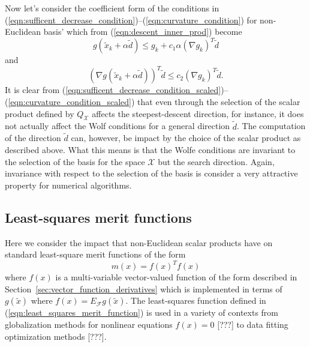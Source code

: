 \documentclass[pdf,ps2pdf,11pt]{SANDreport}
\begin{document}
Now let's consider the coefficient form of the conditions in
(\ref{eqn:sufficent_decrease_condition})--(\ref{eqn:curvature_condition}) for
non-Euclidean basis' which from (\ref{eqn:descent_inner_prod}) become
%
\begin{equation}
g(\tilde{x}_k + \alpha \tilde{d}) \le g_k + c_1 \alpha (\nabla g_k)^T \tilde{d}
\label{eqn:sufficent_decrease_condition_scaled}
\end{equation}
%
and
%
\begin{equation}
(\nabla g(\tilde{x}_k + \alpha \tilde{d}))^T \tilde{d} \le c_2 (\nabla g_k)^T \tilde{d}.
\label{eqn:curvature_condition_scaled}
\end{equation}
%
It is clear from
(\ref{eqn:sufficent_decrease_condition_scaled})--(\ref{eqn:curvature_condition_scaled})
that even through the selection of the scalar product defined by
$Q_{\mathcal{X}}$ affects the steepest-descent direction, for instance, it
does not actually affect the Wolf conditions for a general direction
$\tilde{d}$.  The computation of the direction $\tilde{d}$ can, however, be
impact by the choice of the scalar product as described above.  What this
means is that the Wolfe conditions are invariant to the selection of the basis
for the space $\mathcal{X}$ but the search direction.  Again, invariance with
respect to the selection of the basis is consider a very attractive property
for numerical algorithms.

\subsection{Least-squares merit functions}

Here we consider the impact that non-Euclidean scalar products have on
standard least-square merit functions of the form
%
\begin{equation}
m(x) = f(x)^T f(x)
\label{eqn:least_squares_merit_function}
\end{equation}
%
where $f(x)$ is a multi-variable vector-valued function of the form described
in Section~\ref{sec:vector_function_derivatives} which is implemented in terms
of $g(\tilde{x})$ where $f(x) = E_{\mathcal{F}} g(\tilde{x})$.  The
least-squares function defined in (\ref{eqn:least_squares_merit_function}) is
used in a variety of contexts from globalization methods for nonlinear
equations $f(x)=0$ [???] to data fitting optimization methods [???].
\end{document}
